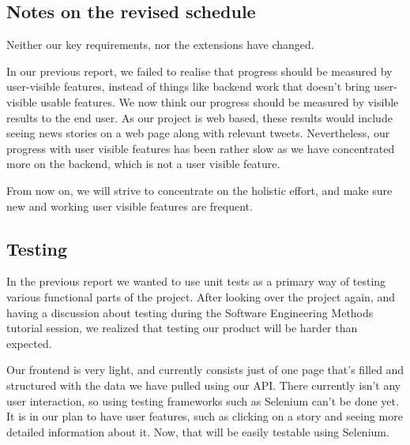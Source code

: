 \documentclass[a4paper,12pt]{article}
\begin{document}
  \subsection{Notes on the revised schedule}
	
	Neither our key requirements, nor the extensions have changed.
	
  
	In our previous report, we failed to realise that progress should be measured by user-visible features, instead of things like backend work that doesn't bring user-visible usable features. We now think our progress should be measured by visible results to the end user. As our project is web based, these results would include seeing news stories on a web page along with relevant tweets. Nevertheless, our progress with user visible features has been rather slow as we have concentrated more on the backend, which is not a user visible feature.

	From now on, we will strive to concentrate on the holistic effort, and make sure new and working user visible features are frequent.
	
	\subsection{Testing}
	
	In the previous report we wanted to use unit tests as a primary way of testing various functional parts of the project. After looking over the project again, and having a discussion about testing during the Software Engineering Methods tutorial session, we realized that testing our product will be harder than expected.
	
	Our frontend is very light, and currently consists just of one page that's filled and structured with the data we have pulled using our API. There currently isn't any user interaction, so using testing frameworks such as Selenium can't be done yet. It is in our plan to have user features, such as clicking on a story and seeing more detailed information about it. Now, that will be easily testable using Selenium.
	
\end{document}
